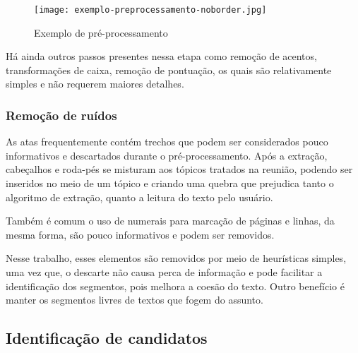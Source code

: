   \begin{figure}[!h]
	\centering
	\texttt{[image: exemplo-preprocessamento-noborder.jpg]}
	\caption{Exemplo de pré-processamento}
	\label{fig:exemplopreprocessamento}
  \end{figure}


Há ainda outros passos presentes nessa etapa como remoção de acentos, transformações de caixa, remoção de pontuação, os quais são relativamente simples e não requerem maiores detalhes.





\subsubsection{Remoção de ruídos}

As atas frequentemente contém trechos que podem ser considerados pouco informativos e descartados durante o pré-processamento. 
Após a extração, cabeçalhos e roda-pés se misturam aos tópicos tratados na reunião, podendo ser  inseridos no meio de um tópico e criando uma quebra que prejudica tanto o algoritmo de extração, quanto a leitura do texto pelo usuário.

Também é comum o uso de numerais para marcação de páginas e linhas, da mesma forma, são pouco informativos e podem ser removidos.

Nesse trabalho, esses elementos são removidos por meio de heurísticas simples, uma vez que, o descarte não causa perca de informação e pode facilitar a identificação dos segmentos, pois melhora a coesão do texto. Outro benefício é manter os segmentos livres de textos que fogem do assunto.



		



\subsection{Identificação de candidatos}
	\label{subsec:indentificacaosentencas}
	
